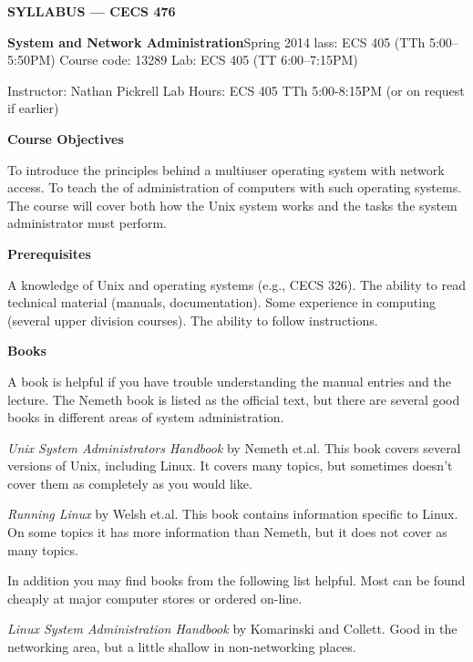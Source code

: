 
\centerline{{\bf SYLLABUS --- CECS 476}}
\vskip 5pt
{\obeylines\parindent 0pt
{\bf System and Network Administration}\hfill Spring 2014
lass: ECS 405 (TTh 5:00--5:50PM) \hfill Course code: 13289 \hfill Lab: ECS 405 (TT 6:00--7:15PM)

Instructor: Nathan Pickrell \hfill Lab Hours: ECS 405  TTh 5:00-8:15PM (or on request if earlier)

}
 
\vskip 5pt
\centerline{\bf Course Objectives}
 
To introduce the principles behind a multiuser operating system with network
access.
To teach the of administration of computers with such operating systems.
The course will cover both how the Unix system works
and the tasks the system administrator must perform.

\vskip 5pt
\centerline{\bf Prerequisites }

A knowledge of Unix and operating systems (e.g., CECS 326).
The ability to read technical material (manuals, documentation).
Some experience in computing (several upper division courses).
The ability to follow instructions.
 
\vskip 5pt
\centerline{\bf Books }
 
A book is helpful if you have trouble understanding the manual entries
and the lecture.
The Nemeth book is listed as the official text, but there are several
good books in different areas of system administration.

{\it Unix System Administrators Handbook}
by Nemeth et.al.
This book covers several versions of Unix, including Linux.
It covers many topics, but sometimes doesn't cover them
as completely as you would like.

{\it Running Linux}
by Welsh et.al.
This book contains information specific to Linux.
On some topics it has more information than Nemeth,
but it does not cover as many topics.

In addition you may find books from the following list helpful. 
Most can be found cheaply at major
computer stores or ordered on-line.


{\it Linux System Administration Handbook}
by Komarinski and Collett. 
Good in the networking area, 
but a little shallow in non-networking places.

